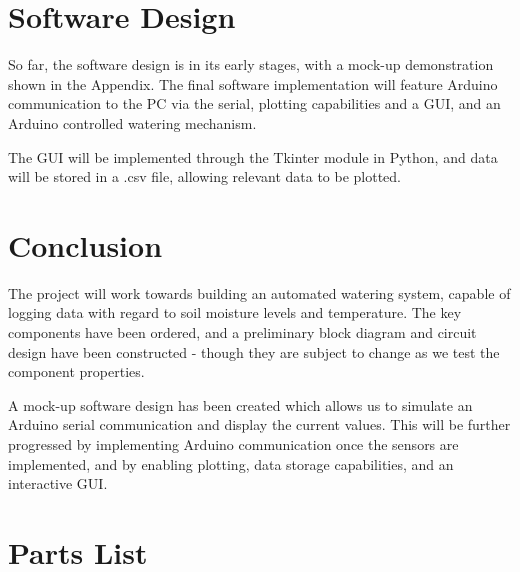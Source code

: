 \documentclass[a4paper,11pt]{article}
\begin{document}
\section{Software Design}
\label{sec:Software_Design}

So far, the software design is in its early stages,
with a mock-up demonstration shown in the Appendix.
The final software implementation will feature 
Arduino communication to the PC via the serial,
plotting capabilities and a GUI,
and an Arduino controlled watering mechanism.

The GUI will be implemented through the Tkinter module in Python,
and data will be stored in a .csv file, allowing relevant data to be plotted.

\section{Conclusion}
\label{sec:Conclusion}

The project will work towards building an automated watering system,
capable of logging data with regard to soil moisture levels and temperature.
The key components have been ordered, 
and a preliminary block diagram and circuit design have been constructed - 
though they are subject to change as we test the component properties.

A mock-up software design has been created which allows us to 
simulate an Arduino serial communication and display the current values.
This will be further progressed by implementing 
Arduino communication once the sensors are implemented,
and by enabling plotting, data storage capabilities, and an interactive GUI.

\newpage
\appendix
\section{Parts List}

\begin{table}[H]
    \centering
    \caption{Component Order Summary}
    \label{tab:component_order}
\end{table}
\end{document}
